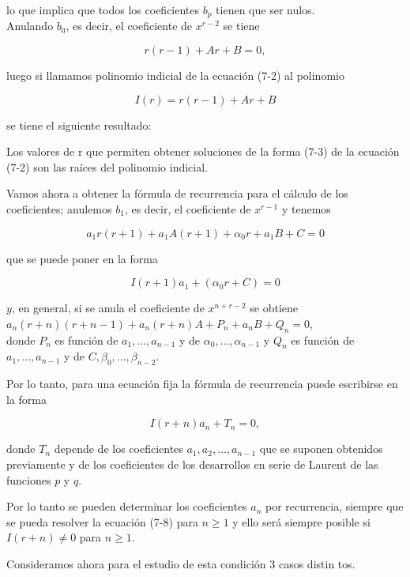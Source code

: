 \documentclass[10pt]{article}
\theoremstyle{plain}
\theoremstyle{definition}
\theoremstyle{remark}
\begin{document}
lo que implica que todos los coeficientes $b_{p}$ tienen que ser nulos.\\
Anulando $b_{0}$, es decir, el coeficiente de $x^{r-2}$ se tiene


\begin{equation*}
r(r-1)+A r+B=0, \tag{7-7}
\end{equation*}


luego si llamamos polinomio indicial de la ecuación (7-2) al polinomio

$$
I(r)=r(r-1)+A r+B
$$

se tiene el siguiente resultado:

Los valores de r que permiten obtener soluciones de la forma (7-3) de la ecuación (7-2) son las raíces del polinomio indicial.

Vamos ahora a obtener la fórmula de recurrencia para el cálculo de los coeficientes; anulemos $b_{1}$, es decir, el coeficiente de $x^{r-1}$ y tenemos

$$
a_{1} r(r+1)+a_{1} A(r+1)+\alpha_{0} r+a_{1} B+C=0
$$

que se puede poner en la forma

$$
I(r+1) a_{1}+\left(\alpha_{0} r+C\right)=0
$$

$y$, en general, si se anula el coeficiente de $x^{n+r-2}$ se obtiene\\
$a_{n}(r+n)(r+n-1)+a_{n}(r+n) A+P_{n}+a_{n} B+Q_{n}=0$,\\
donde $P_{n}$ es función de $a_{1}, \ldots, a_{n-1}$ y de $\alpha_{0}, \ldots, \alpha_{n-1}$ y $Q_{n}$ es función de $a_{1}, \ldots, a_{n-1}$ y de $C, \beta_{0}, \ldots, \beta_{n-2}$.

Por lo tanto, para una ecuación fija la fórmula de recurrencia puede escribirse en la forma


\begin{equation*}
I(r+n) a_{n}+T_{n}=0, \tag{7-8}
\end{equation*}


donde $T_{n}$ depende de los coeficientes $a_{1}, a_{2}, \ldots, a_{n-1}$ que se suponen obtenidos previamente y de los coeficientes de los desarrollos en serie de Laurent de las funciones $p$ y $q$.

Por lo tanto se pueden determinar los coeficientes $a_{n}$ por recurrencia, siempre que se pueda resolver la ecuación (7-8) para $n \geqslant 1$ y ello será siempre posible si $I(r+n) \neq 0$ para $n \geqslant 1$.

Consideramos ahora para el estudio de esta condición 3 casos distin tos.
\end{document}
